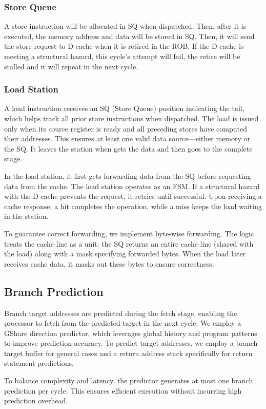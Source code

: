 \subsubsection{Store Queue}

A store instruction will be allocated in SQ when dispatched. Then, after it is executed, the memory address and data will be stored in SQ. Then, it will send the store request to D-cache when it is retired in the ROB. If the D-cache is meeting a structural hazard, this cycle's attempt will fail, the retire will be stalled and it will repeat in the next cycle. 

\subsubsection{Load Station}

A load instruction receives an SQ (Store Queue) position indicating the tail, which helps track all prior store instructions when dispatched. The load is issued only when its source register is ready and all preceding stores have computed their addresses. This ensures at least one valid data source—either memory or the SQ. It leaves the station when gets the data and then goes to the complete stage. 

In the load station, it first gets forwarding data from the SQ before requesting data from the cache. The load station operates as an FSM. If a structural hazard with the D-cache prevents the request, it retries until successful. Upon receiving a cache response, a hit completes the operation, while a miss keeps the load waiting in the station.

To guarantee correct forwarding, we implement byte-wise forwarding. The logic treats the cache line as a unit: the SQ returns an entire cache line (shared with the load) along with a mask specifying forwarded bytes. When the load later receives cache data, it masks out these bytes to ensure correctness. 


\subsection{Branch Prediction}
Branch target addresses are predicted during the fetch stage, enabling the processor to fetch from the predicted target in the next cycle. We employ a GShare direction predictor, which leverages global history and program patterns to improve prediction accuracy. To predict target addresses, we employ a branch target buffer for general cases and a return address stack specifically for return statement predictions.

To balance complexity and latency, the predictor generates at most one branch prediction per cycle. This ensures efficient execution without incurring high prediction overhead.

